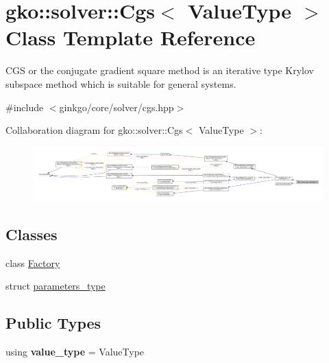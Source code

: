 \hypertarget{classgko_1_1solver_1_1Cgs}{}\section{gko\+:\+:solver\+:\+:Cgs$<$ Value\+Type $>$ Class Template Reference}
\label{classgko_1_1solver_1_1Cgs}


C\+GS or the conjugate gradient square method is an iterative type Krylov subspace method which is suitable for general systems.  




{\ttfamily \#include $<$ginkgo/core/solver/cgs.\+hpp$>$}



Collaboration diagram for gko\+:\+:solver\+:\+:Cgs$<$ Value\+Type $>$\+:
\nopagebreak
\begin{figure}[H]
\begin{center}
\leavevmode
\includegraphics[width=350pt]{classgko_1_1solver_1_1Cgs__coll__graph}
\end{center}
\end{figure}
\subsection*{Classes}
\begin{DoxyCompactItemize}
\item 
class \hyperlink{classgko_1_1solver_1_1Cgs_1_1Factory}{Factory}
\item 
struct \hyperlink{structgko_1_1solver_1_1Cgs_1_1parameters__type}{parameters\+\_\+type}
\end{DoxyCompactItemize}
\subsection*{Public Types}
\begin{DoxyCompactItemize}
\item 
\mbox{\label{classgko_1_1solver_1_1Cgs_a4dce78f8e1e2330a4dc576fa68ea10da}} 
using {\bfseries value\+\_\+type} = Value\+Type
\end{DoxyCompactItemize}
